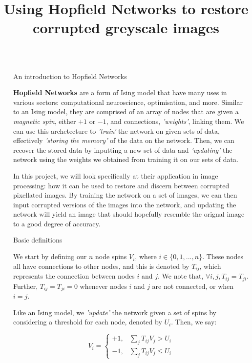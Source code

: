 \documentclass[25pt, a0paper, portrait]{beamer}
\title{Using Hopfield Networks to restore corrupted greyscale images}
\newlength{\sepwidth}
\newlength{\colwidth}
\newcommand{\separatorcolumn}{\begin{column}{\sepwidth}\end{column}}
\begin{document}
\begin{frame}[t]
\begin{columns}[t]
\separatorcolumn

\begin{column}{\colwidth}

  \begin{block}{An introduction to Hopfield Networks} \small

    \textbf{Hopfield Networks} are a form of Ising model that have many uses in various sectors: 
    computational neuroscience, optimisation, and more. Similar to an Ising model, they
    are comprised of an array of nodes that are given a \textit{magnetic spin},
    either $+1$ or $-1$, and connections, \textit{'weights'}, linking them.
    We can use this archetecture to \textit{'train'} the network on given sets of data,
    effectively \textit{'storing the memory'} of the data on the network.
    Then, we can recover the stored data by inputting a new set of data
    and \textit{'updating'} the network using the weights we obtained from training
    it on our sets of data.

    In this project, we will look specifically at their application in image processing: how it can
    be used to restore and discern between corrupted pixellated images. By training the network on
    a set of images, we can then input corrupted versions of the images into the network, and updating
    the network will yield an image that should hopefully resemble the orignal image to a good degree
    of accuracy.

  \end{block}

  \begin{block}{Basic definitions} \small

    We start by defining our $n$ node spins $V_i$, where $i \in \{0, 1, ..., n\}$.
    These nodes all have connections to other nodes, and this is denoted by
    $T_{ij}$, which represents the connection between nodes $i$ and $j$. We note that,
    $\forall i, j, T_{ij} = T_{ji}$. Further, $T_{ij} = T_{ji} = 0$ whenever
    nodes $i$ and $j$ are not connected, or when $i = j$.

    Like an Ising model, we \textit{'update'} the network given a set of spins by
    considering a threshold for each node, denoted by $U_i$. Then, we say:

    \begin{equation} \label{update_rule}
      V_i = \begin{cases} 
              +1, & \sum_{j}T_{ij}V_j > U_i \\
              -1, & \sum_{j}T_{ij}V_j \leq U_i
            \end{cases}
    \end{equation}


\end{block}
\end{column}
\end{columns}
\end{frame}
\end{document}
